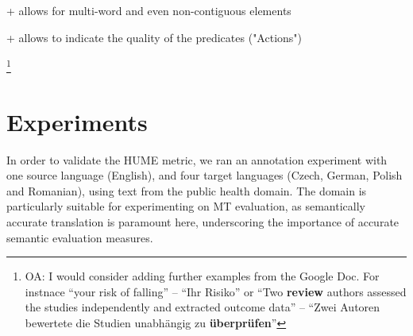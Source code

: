 \documentclass[11pt]{article}
\newcommand{\oa}[1]{\footnote{\color{red}OA: #1}}
\begin{document}
+ allows for multi-word and even non-contiguous elements

+ allows to indicate the quality of the predicates ("Actions")


\oa{I would consider adding further examples from the Google Doc. For instnace ``your risk of falling'' -- ``Ihr Risiko'' or
  ``Two {\bf review} authors assessed the studies independently and extracted outcome data'' -- ``Zwei Autoren bewertete die Studien unabh\"angig zu {\bf \"uberpr\"ufen}''}
  
% 
% 
% 
% 
% 







\section{Experiments}\label{sec:experiments}


In order to validate the HUME metric, we ran an annotation experiment with one source language (English),
and four target languages (Czech, German, Polish and Romanian), using text from the public health domain.
The domain is particularly suitable for experimenting on MT evaluation, as semantically
accurate translation is paramount here, underscoring the importance of accurate
semantic evaluation measures.
\end{document}
